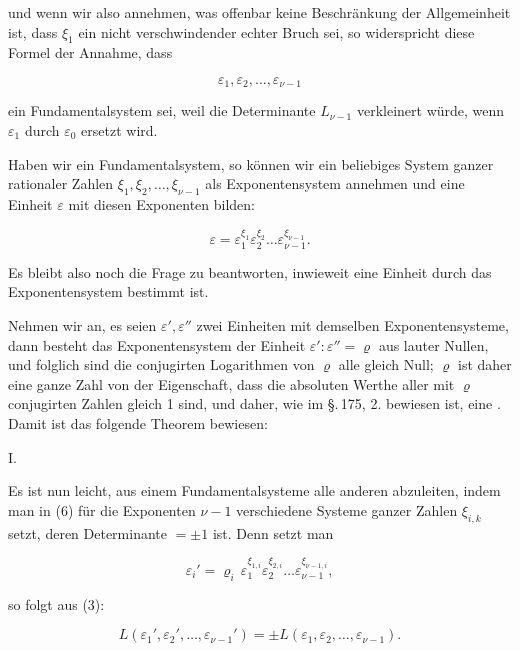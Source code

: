 und wenn wir also annehmen, was offenbar keine Beschränkung
der Allgemeinheit ist, dass $\xi_1$ ein nicht verschwindender echter
Bruch sei, so widerspricht diese Formel der Annahme, dass

\[
\varepsilon_1, \varepsilon_2, \ldots, \varepsilon_{\nu-1}
\]

ein Fundamentalsystem sei, weil die Determinante $L_{\nu-1}$ verkleinert
 würde, wenn $\varepsilon_1$ durch $\varepsilon_0$ ersetzt wird.

Haben wir ein Fundamentalsystem, so können wir ein beliebiges
 System ganzer rationaler Zahlen $\xi_1, \xi_2, \ldots, \xi_{\nu-1}$ als
Exponentensystem annehmen und eine Einheit $\varepsilon$ mit diesen Exponenten
 bilden:

\[
\varepsilon = \varepsilon_1^{\xi_1} \varepsilon_2^{\xi_2} \ldots \varepsilon_{\nu-1}^{\xi_{\nu-1}}.
\]

Es bleibt also noch die Frage zu beantworten, inwieweit
eine Einheit durch das Exponentensystem bestimmt ist.

Nehmen wir an, es seien $\varepsilon', \varepsilon''$ zwei Einheiten mit demselben
Exponentensysteme, dann besteht das Exponentensystem der
Einheit $\varepsilon' : \varepsilon'' = \varrho$ aus lauter Nullen, und folglich sind die conjugirten
 Logarithmen von $\varrho$ alle gleich Null; $\varrho$ ist daher eine
ganze Zahl von der Eigenschaft, dass die absoluten Werthe aller
mit $\varrho$ conjugirten Zahlen gleich 1 sind, und daher, wie im
\S.\,175, 2. bewiesen ist, eine . Damit ist das
folgende Theorem bewiesen:

I. 





Es ist nun leicht, aus einem Fundamentalsysteme alle anderen
abzuleiten, indem man in (6) für die Exponenten $\nu - 1$ verschiedene
 Systeme ganzer Zahlen $\xi_{i,k}$ setzt, deren Determinante
$= \pm 1$ ist. Denn setzt man

\[
\varepsilon_i' = \varrho_i\, \varepsilon_1^{\xi_{1,i}} \varepsilon_2^{\xi_{2,i}} \ldots \varepsilon_{\nu-1}^{\xi_{\nu-1,i}},
\]

so folgt aus (3):

\[
L(\varepsilon_1', \varepsilon_2', \ldots, \varepsilon_{\nu-1}') = \pm L(\varepsilon_1, \varepsilon_2, \ldots, \varepsilon_{\nu-1}).
\]
